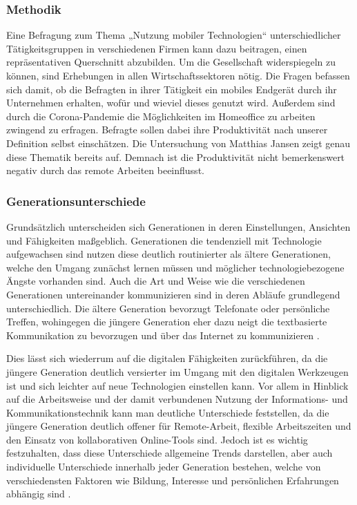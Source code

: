 \documentclass[12pt,a4paper]{article}
\begin{document}
\subsubsection*{Methodik}
Eine Befragung zum Thema „Nutzung mobiler Technologien“ unterschiedlicher Tätigkeitsgruppen in verschiedenen Firmen kann dazu beitragen, einen repräsentativen Querschnitt abzubilden.  
Um die Gesellschaft widerspiegeln zu können, sind Erhebungen in allen Wirtschaftssektoren nötig. 
Die Fragen befassen sich damit, ob die Befragten in ihrer Tätigkeit ein mobiles Endgerät durch ihr Unternehmen erhalten, wofür und wieviel dieses genutzt wird.  
Außerdem sind durch die Corona-Pandemie die Möglichkeiten im Homeoffice zu arbeiten zwingend zu erfragen.  
Befragte sollen dabei ihre Produktivität nach unserer Definition selbst einschätzen. 
Die Untersuchung von Matthias Jansen zeigt genau diese Thematik bereits auf. 
Demnach ist die Produktivität nicht bemerkenswert negativ durch das remote Arbeiten beeinflusst. 
 

\subsubsection*{Generationsunterschiede}
Grundsätzlich unterscheiden sich Generationen in deren Einstellungen, Ansichten und Fähigkeiten maßgeblich. Generationen die tendenziell mit Technologie aufgewachsen sind nutzen diese deutlich routinierter als ältere Generationen, welche den Umgang zunächst lernen müssen und möglicher technologiebezogene Ängste vorhanden sind. Auch die Art und Weise wie die verschiedenen Generationen untereinander kommunizieren sind in deren Abläufe grundlegend unterschiedlich. Die ältere Generation bevorzugt Telefonate oder persönliche Treffen, wohingegen die jüngere Generation eher dazu neigt die textbasierte Kommunikation zu bevorzugen und über das Internet zu kommunizieren \parencite[vgl.][]{wollersheim2021bildung}. 

Dies lässt sich wiederrum auf die digitalen Fähigkeiten zurückführen, da die jüngere Generation deutlich versierter im Umgang mit den digitalen Werkzeugen ist und sich leichter auf neue Technologien einstellen kann. Vor allem in Hinblick auf die Arbeitsweise und der damit verbundenen Nutzung der Informations- und Kommunikationstechnik kann man deutliche Unterschiede feststellen, da die jüngere Generation deutlich offener für Remote-Arbeit, flexible Arbeitszeiten und den Einsatz von kollaborativen Online-Tools sind. Jedoch ist es wichtig festzuhalten, dass diese Unterschiede allgemeine Trends darstellen, aber auch individuelle Unterschiede innerhalb jeder Generation bestehen, welche von verschiedensten Faktoren wie Bildung, Interesse und persönlichen Erfahrungen abhängig sind \parencite[vgl.][]{gorovoj2019technologieakzeptanz}.
\end{document}
